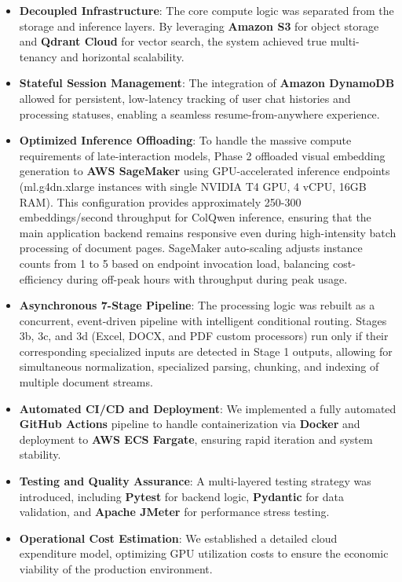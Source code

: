 \begin{itemize}
    \item \textbf{Decoupled Infrastructure}: The core compute logic was separated from the storage and inference layers. By leveraging \textbf{Amazon S3} for object storage and \textbf{Qdrant Cloud} for vector search, the system achieved true multi-tenancy and horizontal scalability.
    \item \textbf{Stateful Session Management}: The integration of \textbf{Amazon DynamoDB} allowed for persistent, low-latency tracking of user chat histories and processing statuses, enabling a seamless resume-from-anywhere experience.
    \item \textbf{Optimized Inference Offloading}: To handle the massive compute requirements of late-interaction models, Phase 2 offloaded visual embedding generation to \textbf{AWS SageMaker} using GPU-accelerated inference endpoints (ml.g4dn.xlarge instances with single NVIDIA T4 GPU, 4 vCPU, 16GB RAM). This configuration provides approximately 250-300 embeddings/second throughput for ColQwen inference, ensuring that the main application backend remains responsive even during high-intensity batch processing of document pages. SageMaker auto-scaling adjusts instance counts from 1 to 5 based on endpoint invocation load, balancing cost-efficiency during off-peak hours with throughput during peak usage.
    \item \textbf{Asynchronous 7-Stage Pipeline}: The processing logic was rebuilt as a concurrent, event-driven pipeline with intelligent conditional routing. Stages 3b, 3c, and 3d (Excel, DOCX, and PDF custom processors) run only if their corresponding specialized inputs are detected in Stage 1 outputs, allowing for simultaneous normalization, specialized parsing, chunking, and indexing of multiple document streams.
    \item \textbf{Automated CI/CD and Deployment}: We implemented a fully automated \textbf{GitHub Actions} pipeline to handle containerization via \textbf{Docker} and deployment to \textbf{AWS ECS Fargate}, ensuring rapid iteration and system stability.
    \item \textbf{Testing and Quality Assurance}: A multi-layered testing strategy was introduced, including \textbf{Pytest} for backend logic, \textbf{Pydantic} for data validation, and \textbf{Apache JMeter} for performance stress testing.
    \item \textbf{Operational Cost Estimation}: We established a detailed cloud expenditure model, optimizing GPU utilization costs to ensure the economic viability of the production environment.
\end{itemize}

